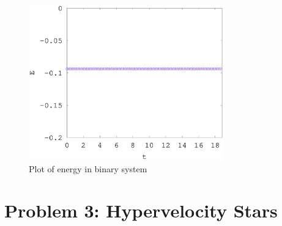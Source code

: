 \documentclass[a4paper,12pt]{article}
\begin{document}
\begin{figure}[H]
\centering
\includegraphics[width=0.75\textwidth]{./problem2/problem2_2}
\caption{Plot of energy in binary system}
\label{fig:problem2_2}
\end{figure}

\newpage
\section{Problem 3: Hypervelocity Stars}
\end{document}
